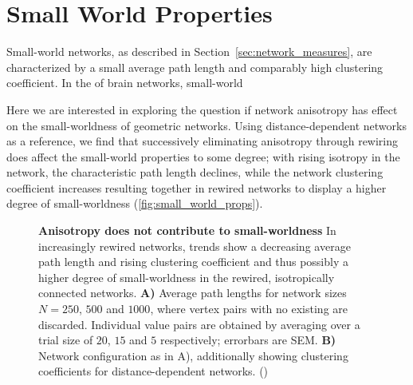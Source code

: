 

\newpage
\section{Small World Properties}\label{sec:small_world}

Small-world networks, as described in
Section~\ref{sec:network_measures}, are characterized by a small average path length and comparably high clustering coefficient. In the
of brain networks, small-world

\parencite{Watts1998}

Here we are interested in exploring the question if network anisotropy
has effect on the small-worldness of geometric networks. Using
distance-dependent networks as a reference, we find that successively eliminating
anisotropy through rewiring does affect the small-world properties to
some degree; with rising isotropy in the network, the characteristic
path length declines, while the network clustering coefficient
increases resulting together in rewired networks to display a higher
degree of small-worldness (\autoref{fig:small_world_props}).


\begin{figure}[htp]
  \centering
  \caption{\textbf{Anisotropy does not contribute to small-worldness}
    In increasingly rewired networks, trends show a decreasing average
    path length and rising clustering coefficient and thus possibly a
    higher degree of small-worldness in the rewired, isotropically
    connected networks.  \textbf{A)} Average path lengths for network
    sizes $N=250$, $500$ and $1000$, where vertex pairs with no
    existing are discarded. Individual value pairs are obtained by
    averaging over a trial size of $20$, $15$ and $5$ respectively;
    errorbars are SEM. \textbf{B)} Network configuration as in A),
    additionally showing clustering coefficients for
    distance-dependent networks.
    ()} %
  \label{fig:small_world_props}
\end{figure}  


